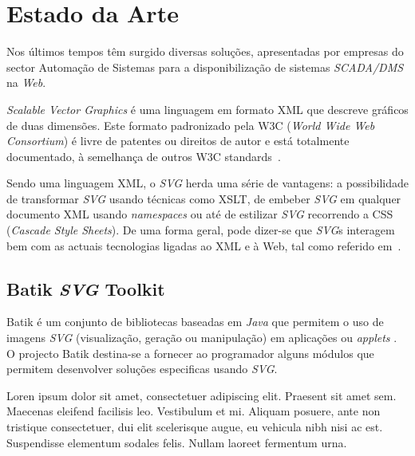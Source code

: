 \documentclass[twocolumn,twoside,10pt,a4paper]{article}
\newcommand{\class}[1]{{\normalfont\slshape #1\/}}
\newcommand{\svg}{\class{SVG}}
\newcommand{\scadadms}{\class{SCADA/DMS}}
\begin{document}
\section{Estado da Arte}\label{sec:estart}

Nos últimos tempos têm surgido diversas soluções, apresentadas por
empresas do sector Automação de Sistemas para a disponibilização de
sistemas \scadadms{} na \textit{Web}.

\emph{Scalable Vector Graphics} é uma linguagem em formato XML que
descreve gráficos de duas dimensões. 
Este formato padronizado pela W3C (\emph{World Wide Web Consortium})
é livre de patentes ou direitos de autor e está totalmente
documentado, à semelhança de outros W3C standards~\cite{kn:svgdoc}.

Sendo uma linguagem XML, o \svg{} herda uma série de vantagens: a
possibilidade de transformar \svg{} usando técnicas como XSLT, de embeber
\svg{} em qualquer documento XML usando \textit{namespaces} ou até de 
estilizar \svg{} recorrendo a CSS (\emph{Cascade Style Sheets}). 
De uma forma geral, pode dizer-se que \svg{}s interagem bem com as
actuais tecnologias ligadas ao XML e à Web, tal como referido
em~\cite{kn:svgibm,kn:svgw3c}.


\subsection{Batik \svg{} Toolkit} \label{batik} 

Batik é um conjunto de bibliotecas baseadas em \textit{Java} que
permitem o uso de imagens \svg{} (visualização, geração ou
manipulação) em aplicações ou \textit{applets} \cite{kn:batikarchitecture}.  
O projecto Batik destina-se a fornecer ao programador alguns módulos
que permitem desenvolver soluções especificas usando \svg. 

Loren ipsum dolor sit amet, consectetuer adipiscing elit. 
Praesent sit amet sem. Maecenas eleifend facilisis leo. Vestibulum et
mi. Aliquam posuere, ante non tristique consectetuer, dui elit
scelerisque augue, eu vehicula nibh nisi ac est. Suspendisse elementum
sodales felis. Nullam laoreet fermentum urna. 
\end{document}
